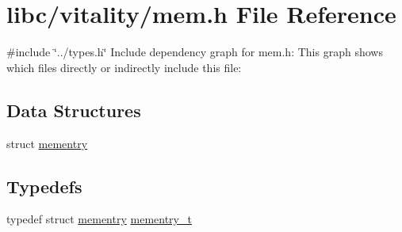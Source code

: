 \hypertarget{a00110}{}\section{libc/vitality/mem.h File Reference}
\label{a00110}
{\ttfamily \#include \char`\"{}../types.\+h\char`\"{}}\newline
Include dependency graph for mem.\+h\+:
This graph shows which files directly or indirectly include this file\+:
\subsection*{Data Structures}
\begin{DoxyCompactItemize}
\item 
struct \hyperlink{a00164}{mementry}
\end{DoxyCompactItemize}
\subsection*{Typedefs}
\begin{DoxyCompactItemize}
\item 
typedef struct \hyperlink{a00164}{mementry} \hyperlink{a00110_a876b6ee19692762a87e4673911f9b8da_a876b6ee19692762a87e4673911f9b8da}{mementry\+\_\+t}
\end{DoxyCompactItemize}

